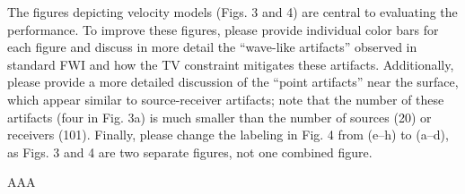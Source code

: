 \begin{point}
	The figures depicting velocity models (Figs. 3 and 4) are central to evaluating the performance. To improve these figures, please provide individual color bars for each figure and discuss in more detail the “wave-like artifacts” observed in standard FWI and how the TV constraint mitigates these artifacts. Additionally, please provide a more detailed discussion of the “point artifacts” near the surface, which appear similar to source-receiver artifacts; note that the number of these artifacts (four in Fig. 3a) is much smaller than the number of sources (20) or receivers (101). Finally, please change the labeling in Fig. 4 from (e–h) to (a–d), as Figs. 3 and 4 are two separate figures, not one combined figure.
\end{point}

\begin{reply}
	AAA
\end{reply}


